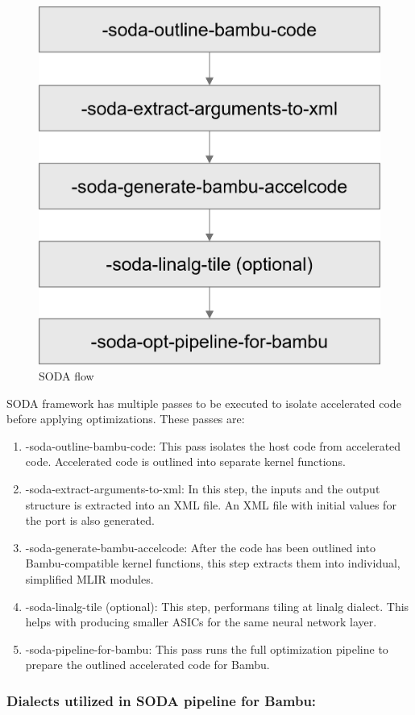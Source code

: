 \begin{figure}[H]
    \centering
    \includegraphics[width=0.4\linewidth]{figure//chapter1_intro/Fig 2 - SODA-OPT Flow.png}
    \caption{SODA flow}
    \label{fig:1.2}
\end{figure}

SODA framework has multiple passes to be executed to isolate accelerated code before applying optimizations. These passes are:

\begin{enumerate}
    
    \item -soda-outline-bambu-code: This pass isolates the host code from accelerated code. Accelerated code is outlined into separate kernel functions.
    \item -soda-extract-arguments-to-xml: In this step, the inputs and the output structure is extracted into an XML file. An XML file with initial values for the port is also generated. 
    \item -soda-generate-bambu-accelcode: After the code has been outlined into Bambu-compatible kernel functions, this step extracts them into individual, simplified MLIR modules.
    \item -soda-linalg-tile (optional): This step, performans tiling at linalg dialect. This helps with producing smaller ASICs for the same neural network layer.
    \item -soda-pipeline-for-bambu: This pass runs the full optimization pipeline to prepare the outlined accelerated code for Bambu.

\end{enumerate}

\subsubsection{Dialects utilized in SODA pipeline for Bambu:}

